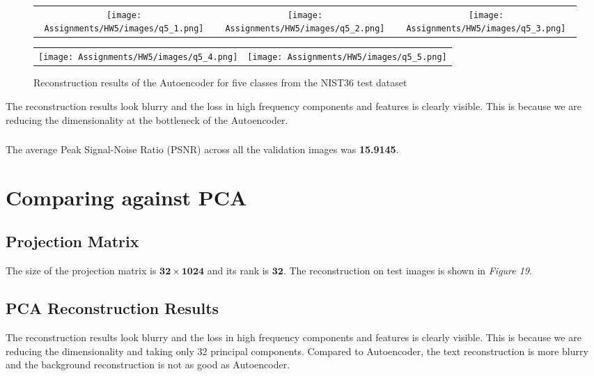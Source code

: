 \documentclass[a4paper]{article}
\begin{document}
\subsubsection{}
\begin{figure}[!ht]
\centering
\begin{tabular}{ccc}
{\texttt{[image: Assignments/HW5/images/q5\_1.png]}} &
{\texttt{[image: Assignments/HW5/images/q5\_2.png]}} &
{\texttt{[image: Assignments/HW5/images/q5\_3.png]}}
\end{tabular}
\begin{tabular}{cc}
{\texttt{[image: Assignments/HW5/images/q5\_4.png]}} &
{\texttt{[image: Assignments/HW5/images/q5\_5.png]}}
\end{tabular}
\caption{Reconstruction results of the Autoencoder for five classes from the NIST36 test dataset}
\end{figure}

The reconstruction results look blurry and the loss in high frequency components and features is clearly visible. This is because we are reducing the dimensionality at the bottleneck of the Autoencoder.

\subsubsection{}
The average Peak Signal-Noise Ratio (PSNR) across all the validation images was \textbf{15.9145}.

\section{Comparing against PCA}
\subsection{Projection Matrix}
The size of the projection matrix is $\mathbf{32 \times 1024}$ and its rank is $\mathbf{32}$. The reconstruction on test images is shown in \textit{Figure 19}.

\subsection{PCA Reconstruction Results}
The reconstruction results look blurry and the loss in high frequency components and features is clearly visible. This is because we are reducing the dimensionality and taking only 32 principal components. Compared to Autoencoder, the text reconstruction is more blurry and the background reconstruction is not as good as Autoencoder.
\end{document}
